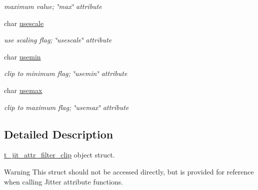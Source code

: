 \begin{DoxyCompactItemize}
\begin{DoxyCompactList}\small\item\em maximum value; \char`\"{}max\char`\"{} attribute \item\end{DoxyCompactList}\item 
\hypertarget{structt__jit__attr__filter__clip_a9a0dcf974fd6c6126efd13d2a83e73a9}{
char \hyperlink{structt__jit__attr__filter__clip_a9a0dcf974fd6c6126efd13d2a83e73a9}{usescale}}
\label{structt__jit__attr__filter__clip_a9a0dcf974fd6c6126efd13d2a83e73a9}

\begin{DoxyCompactList}\small\item\em use scaling flag; \char`\"{}usescale\char`\"{} attribute \item\end{DoxyCompactList}\item 
\hypertarget{structt__jit__attr__filter__clip_a2c635f15f8f856fcc0171d0c84ee92d9}{
char \hyperlink{structt__jit__attr__filter__clip_a2c635f15f8f856fcc0171d0c84ee92d9}{usemin}}
\label{structt__jit__attr__filter__clip_a2c635f15f8f856fcc0171d0c84ee92d9}

\begin{DoxyCompactList}\small\item\em clip to minimum flag; \char`\"{}usemin\char`\"{} attribute \item\end{DoxyCompactList}\item 
\hypertarget{structt__jit__attr__filter__clip_a2980fcf09ab4f0de22aea2eab8bfc1c5}{
char \hyperlink{structt__jit__attr__filter__clip_a2980fcf09ab4f0de22aea2eab8bfc1c5}{usemax}}
\label{structt__jit__attr__filter__clip_a2980fcf09ab4f0de22aea2eab8bfc1c5}

\begin{DoxyCompactList}\small\item\em clip to maximum flag; \char`\"{}usemax\char`\"{} attribute \item\end{DoxyCompactList}\end{DoxyCompactItemize}


\subsection{Detailed Description}
\hyperlink{structt__jit__attr__filter__clip}{t\_\-jit\_\-attr\_\-filter\_\-clip} object struct. \begin{DoxyWarning}{Warning}
This struct should not be accessed directly, but is provided for reference when calling Jitter attribute functions. 
\end{DoxyWarning}
